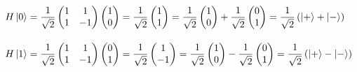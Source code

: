 \documentclass[12pt]{article}
\numberwithin{equation}{section} %
\begin{document}
    \begin{align*}
        & H \ket{0} = \frac{1}{\sqrt{2}} \begin{pmatrix}
            1 & 1 \\
            1 & -1
        \end{pmatrix} \begin{pmatrix}
            1 \\
            0
        \end{pmatrix} = \frac{1}{\sqrt{2}} \begin{pmatrix}
            1 \\
            1
        \end{pmatrix} = \frac{1}{\sqrt{2}} \begin{pmatrix}
            1 \\
            0
        \end{pmatrix} + \frac{1}{\sqrt{2}} \begin{pmatrix}
            0 \\
            1
        \end{pmatrix} = \frac{1}{\sqrt{2}} \left( \ket{+} + \ket{-} \right) \\[10pt]
        & H \ket{1} = \frac{1}{\sqrt{2}} \begin{pmatrix}
            1 & 1 \\
            1 & -1
        \end{pmatrix} \begin{pmatrix}
            0 \\
            1
        \end{pmatrix} = \frac{1}{\sqrt{2}} \begin{pmatrix}
            1 \\
            -1
        \end{pmatrix} = \frac{1}{\sqrt{2}} \begin{pmatrix}
            1 \\
            0
        \end{pmatrix} - \frac{1}{\sqrt{2}} \begin{pmatrix}
            0 \\
            1
        \end{pmatrix} = \frac{1}{\sqrt{2}} \left( \ket{+} - \ket{-} \right)
    \end{align*}

    \vspace{2.5mm}
\end{document}

